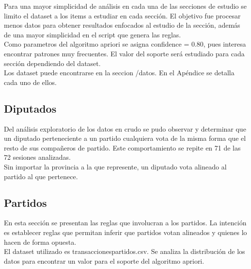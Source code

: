 \documentclass{endm}
\begin{document}
Para una mayor simplicidad de análisis en cada una de las secciones de estudio se limito el dataset a los items a estudiar en cada sección. El objetivo fue procesar menos datos para obtener resultados enfocados al estudio de la sección, además de una mayor simplicidad en el script que genera las reglas.\\

Como parametros del algoritmo apriori se asigna confidence = 0.80, pues interesa encontrar patrones muy frecuentes. El valor del soporte será estudiado para cada sección dependiendo del dataset. \\

Los dataset puede encontrarse en la seccion /datos. En el Apéndice se detalla cada uno de ellos. \\

\subsection{Diputados}

Del análisis exploratorio de los datos en crudo se pudo observar y determinar que un diputado perteneciente a un partido cualquiera vota de la misma forma que el resto de sus compañeros de partido. Este comportamiento se repite en 71 de las 72 sesiones analizadas.\\

Sin importar la provincia a la que represente, un diputado vota alineado al partido al que pertenece.\\

\subsection{Partidos}

En esta sección se presentan las reglas que involucran a los partidos. La intención es establecer reglas que permitan inferir que partidos votan alineados y quienes lo hacen de forma opuesta. \\

El dataset utilizado es transaccionespartidos.csv. Se analiza la distribución de los datos para encontrar un valor para el soporte del algoritmo apriori. \\
\end{document}

